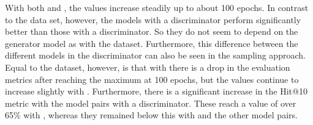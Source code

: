 With both \usmax and \ussoftmax, the values increase steadily up to about 100 epochs.
In contrast to the \umls data set, however, the models with a \transd discriminator perform significantly better than those with a \transe discriminator.
So they do not seem to depend on the generator model as with the \umls dataset.
Furthermore, this difference between the different models in the discriminator can also be seen in the \ussoftmax sampling approach.
Equal to the \umls dataset, however, is that with \usmax there is a drop in the evaluation metrics after reaching the maximum at 100 epochs, but the values continue to increase slightly with \ussoftmax.
Furthermore, there is a significant increase in the Hit@10 metric with the model pairs with a \transd discriminator.
These reach a value of over 65\% with \ussoftmax, whereas they remained below this with \usmax and the other model pairs.

